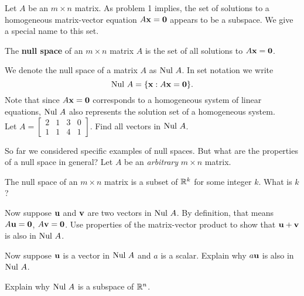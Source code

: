 \begin{pa}
	\ea

\item Let $A$ be an $m \times n$ matrix. As problem 1 implies, the set of solutions to a homogeneous matrix-vector equation $A \mathbf{x} = \mathbf{0}$ appears to be a subspace. We give a special name to this set.



\begin{definition} \label{def:null_space} The \textbf{null space} of an $m \times n$ matrix $A$ is the set of all solutions to $A \mathbf{x} = \mathbf{0}$.
\end{definition}



We denote the null space of a matrix $A$ as $\text{Nul } A$. In set notation we write
\[\text{Nul } A = \{ \mathbf{x} : A \mathbf{x} = \mathbf{0}\}.\]
Note that since $A\mathbf{x}=\mathbf{0}$ corresponds to a homogeneous system of linear equations, $\text{Nul } A$ also represents the solution set of a homogeneous system.\\

Let $A =  \left[ \begin{array}{cccc} 2&1&3&0\\ 1&1&4&1 \end{array} \right]$. Find all vectors in $\text{Nul } A$. 



\item So far we considered specific examples of null spaces. But what are the properties of a null space in general? Let $A$ be an \emph{arbitrary} $m \times n$ matrix. 
	\ba
	\item The null space of an $m \times n$ matrix is a subset of $\mathbb{R}^k$ for some integer $k$. What is $k$?


	
	\item Now suppose $\mathbf{u}$ and $\mathbf{v}$ are two vectors in $\text{Nul } A$. By definition, that means $A\mathbf{u}=\mathbf{0}$, $A\mathbf{v}=\mathbf{0}$. Use properties of the matrix-vector product to show that $\mathbf{u} + \mathbf{v}$ is also in $\text{Nul } A$. 



\item Now suppose $\mathbf{u}$ is a vector in $\text{Nul } A$ and $a$ is a scalar. Explain why $a\mathbf{u}$ is also in $\text{Nul } A$. 



	\item Explain why $\text{Nul } A$ is a subspace of $\mathbb{R}^n$. 

	\ea
	
\ee
\end{pa}


